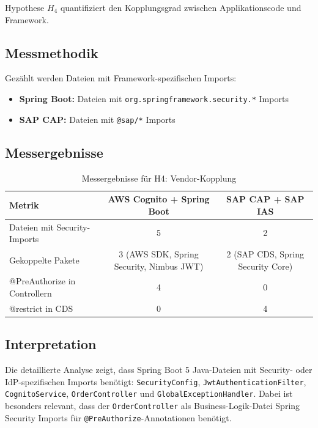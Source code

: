 Hypothese $H_4$ quantifiziert den Kopplungsgrad zwischen Applikationscode und
Framework.

\subsection{Messmethodik}

Gezählt werden Dateien mit Framework-spezifischen Imports:
\begin{itemize}
    \item \textbf{Spring Boot:} Dateien mit \texttt{org.springframework.security.*} Imports
    \item \textbf{SAP CAP:} Dateien mit \texttt{@sap/*} Imports
\end{itemize}

\subsection{Messergebnisse}

\begin{table}[h]
    \centering
    \begin{tabular}{|l|c|c|}
        \hline
        \textbf{Metrik} & \textbf{AWS Cognito + Spring Boot}  & \textbf{SAP CAP + SAP IAS}  \\
        \hline
        Dateien mit Security-Imports  & 5 & 2 \\
        \hline
        Gekoppelte Pakete & 3 (AWS SDK, Spring Security, Nimbus JWT)  & 2 (SAP CDS, Spring Security Core) \\
        \hline
        @PreAuthorize in Controllern  & 4 & 0 \\
        \hline
        @restrict in CDS  & 0 & 4 \\
        \hline
    \end{tabular}
    \caption{Messergebnisse für H4: Vendor-Kopplung}
    \label{tab:h4_ergebnisse}
\end{table}

\subsection{Interpretation}

Die detaillierte Analyse zeigt, dass Spring Boot 5 Java-Dateien mit Security- oder IdP-spezifischen Imports benötigt: \texttt{SecurityConfig}, \texttt{JwtAuthenticationFilter}, \texttt{CognitoService}, \texttt{OrderController} und \texttt{GlobalExceptionHandler}. Dabei ist besonders relevant, dass der \texttt{OrderController} als Business-Logik-Datei Spring Security Imports für \texttt{@PreAuthorize}-Annotationen benötigt.

